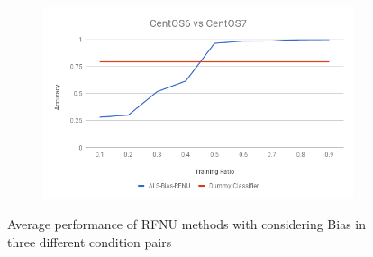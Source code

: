 \documentclass[10pt, conference, compsocconf]{IEEEtran}
\begin{document}
\begin{figure}[h!]
\begin{subfigure}[b]{0.8\linewidth}
                \includegraphics[width=\columnwidth]{figures/ALS-Bias/RFNU-ALS-Bias-6vs7-PFS}
        \end{subfigure}
        \caption{Average performance of RFNU methods with considering Bias in three different condition pairs}
        \label{fig:RFNU method}
\end{figure}
\end{document}
